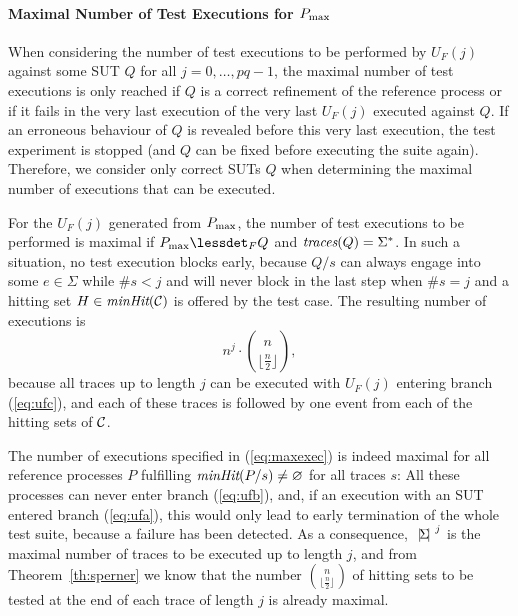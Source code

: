 \paragraph{Maximal Number of Test Executions for $P_\text{max}$}
When considering the number of test executions to be performed by $U_F(j)$
against some SUT $Q$ for all $j=0,\dots,pq-1$, the maximal number of test
executions is only reached if $Q$ is a correct refinement of the reference
process or if it fails in the very last execution of the very last $U_F(j)$
executed against $Q$. If an erroneous behaviour of $Q$ is revealed before
this very last execution, the test experiment is stopped (and $Q$ can be
fixed before executing the suite again). Therefore, we consider only correct
SUTs $Q$ when determining the maximal number of executions that can be
executed.

For the  $U_F(j)$ generated from $P_\text{max}$, the number of test executions
 to be performed is maximal if $\pmax\lessdet_F Q$ and
$\text{\it traces}(Q) = \Sigma^*$. In such a situation, no test execution blocks early, because
$Q/s$ can always engage into some $e\in\Sigma$   while $\#s<j$ and will never block
in the last step when $\#s = j$ and a hitting set $H\in\text{\it minHit}({\cal C})$ is
offered by the test case. The resulting number of executions is
%
\begin{equation}
\label{eq:maxexec}
n^{j}\cdot \binom{n}{\lfloor\frac{n}{2}\rfloor},
\end{equation}
%
because all traces up to length $j$ can be executed with $U_F(j)$ entering branch
(\ref{eq:ufc}), and each of these traces is followed by one event
from each of the hitting sets of ${\cal C}$.

The number of executions specified in (\ref{eq:maxexec}) is indeed maximal for
all reference processes $P$ fulfilling $\text{\it minHit}(P/s)\neq\varnothing$ for all
traces $s$: All these processes can never enter branch (\ref{eq:ufb}), and,
if an execution with an SUT entered branch (\ref{eq:ufa}), this would only lead to early termination of the whole test suite, because a failure has been detected.
As a consequence, ${~|\! \Sigma\!|~}^{j}$ is the maximal number of traces to be executed
up to length $j$, and from Theorem~\ref{th:sperner} we know that the number
$\binom{n}{\lfloor\frac{n}{2}\rfloor}$ of hitting sets to be tested at the end of each trace of length $j$ is already maximal.

